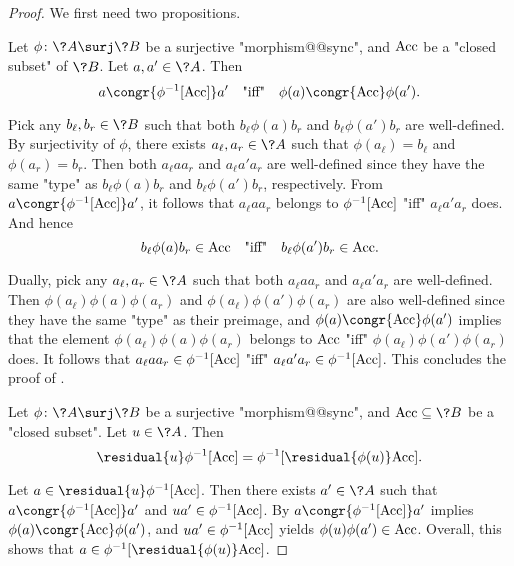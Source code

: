 \begin{proof}
	We first need two propositions.

	\begin{claim}
		\label{claim:inverse-morphism-preserve-congruence}
		Let $\phi\colon \?A \surj \?B$ be a surjective "morphism@@sync",
		and $\textrm{Acc}$ be a "closed subset" of $\?B$. Let $a, a' \in \?A$.
		Then
		\[
			a \congr{\phi^{-1}[\Acc]} a'
			\quad\text{"iff"}\quad
			\phi(a) \congr{\Acc} \phi(a').
		\]
	\end{claim}
	
	Pick any $b_\ell, b_r \in \?B$ such that both
	$b_\ell \phi(a) b_r$ and
	$b_\ell \phi(a') b_r$
	are well-defined. By surjectivity of $\phi$, there exists
	$a_\ell, a_r \in \?A$
	such that $\phi(a_\ell) = b_\ell$
	and $\phi(a_r) = b_r$.
	Then both $a_\ell a a_r$
	and $a_\ell a' a_r$ are well-defined since they have the same "type"
	as $b_\ell \phi(a) b_r$ and $b_\ell \phi(a') b_r$, respectively.
	From $a \congr{\phi^{-1}[\Acc]} a'$,
	it follows that $a_\ell a a_r$ belongs to $\phi^{-1}[\textrm{Acc}]$ "iff" $a_\ell a' a_r$ does.
	And hence
	\[
		b_\ell \phi(a) b_r \in \textrm{Acc} 
			\quad\text{"iff"}\quad
		b_\ell \phi(a') b_r \in \textrm{Acc}.
	\]

	Dually, pick any $a_\ell, a_r \in \?A$ such that both
	$a_\ell a a_r$ and $a_\ell a' a_r$ are well-defined.
	Then $\phi(a_\ell) \phi(a) \phi(a_r)$ and $\phi(a_\ell) \phi(a') \phi(a_r)$
	are also well-defined since they have the same "type" as their preimage,
	and $\phi(a) \congr{\Acc} \phi(a')$ implies that the element $\phi(a_\ell) \phi(a) \phi(a_r)$ belongs
	to $\textrm{Acc}$ "iff" $\phi(a_\ell) \phi(a') \phi(a_r)$ does. It follows
	that $a_\ell a a_r \in \phi^{-1}[\textrm{Acc}]$ "iff" $a_\ell a' a_r \in \phi^{-1}[\textrm{Acc}]$.
	This concludes the proof of .
	
	
	\begin{claim}
		\label{claim:inverse-morphism-preserve-residuals}
		Let $\phi\colon \?A \surj \?B$ be a surjective "morphism@@sync", and $\Acc \subseteq \?B$
		be a "closed subset". Let $u \in \?A$. Then
		\[\residual{u}\phi^{-1}[\Acc] = \phi^{-1}[\residual{\phi(u)}\Acc].\]
	\end{claim}
	
	Let $a\in \residual{u}\phi^{-1}[\Acc]$.
	Then there exists $a' \in \?A$ such that $a \congr{\phi^{-1}[\Acc]} a'$
	and $ua' \in \phi^{-1}[\textrm{Acc}]$.
	By 
	$a \congr{\phi^{-1}[\Acc]} a'$ implies $\phi(a) \congr{\Acc} \phi(a')$,
	and $ua' \in \phi^{-1}[\textrm{Acc}]$ yields $\phi(u)\phi(a') \in \textrm{Acc}$.
	Overall, this shows that $a \in \phi^{-1}[\residual{\phi(u)}\Acc]$.


\end{proof}
